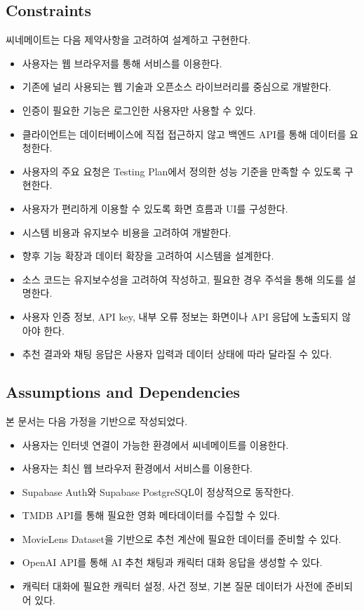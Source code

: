\documentclass[11pt,a4paper]{article}
\providecommand{\tightlist}{%
  \setlength{\itemsep}{0.25em}\setlength{\parskip}{0.1em}}
\begin{document}
\hypertarget{constraints}{%
\subsection{Constraints}\label{constraints}}

씨네메이트는 다음 제약사항을 고려하여 설계하고 구현한다.

\begin{itemize}
\tightlist
\item
  사용자는 웹 브라우저를 통해 서비스를 이용한다.
\item
  기존에 널리 사용되는 웹 기술과 오픈소스 라이브러리를 중심으로 개발한다.
\item
  인증이 필요한 기능은 로그인한 사용자만 사용할 수 있다.
\item
  클라이언트는 데이터베이스에 직접 접근하지 않고 백엔드 API를 통해 데이터를 요청한다.
\item
  사용자의 주요 요청은 Testing Plan에서 정의한 성능 기준을 만족할 수 있도록 구현한다.
\item
  사용자가 편리하게 이용할 수 있도록 화면 흐름과 UI를 구성한다.
\item
  시스템 비용과 유지보수 비용을 고려하여 개발한다.
\item
  향후 기능 확장과 데이터 확장을 고려하여 시스템을 설계한다.
\item
  소스 코드는 유지보수성을 고려하여 작성하고, 필요한 경우 주석을 통해 의도를 설명한다.
\item
  사용자 인증 정보, API key, 내부 오류 정보는 화면이나 API 응답에 노출되지 않아야 한다.
\item
  추천 결과와 채팅 응답은 사용자 입력과 데이터 상태에 따라 달라질 수 있다.
\end{itemize}

\hypertarget{assumptions-and-dependencies}{%
\subsection{Assumptions and Dependencies}\label{assumptions-and-dependencies}}

본 문서는 다음 가정을 기반으로 작성되었다.

\begin{itemize}
\tightlist
\item
  사용자는 인터넷 연결이 가능한 환경에서 씨네메이트를 이용한다.
\item
  사용자는 최신 웹 브라우저 환경에서 서비스를 이용한다.
\item
  Supabase Auth와 Supabase PostgreSQL이 정상적으로 동작한다.
\item
  TMDB API를 통해 필요한 영화 메타데이터를 수집할 수 있다.
\item
  MovieLens Dataset을 기반으로 추천 계산에 필요한 데이터를 준비할 수 있다.
\item
  OpenAI API를 통해 AI 추천 채팅과 캐릭터 대화 응답을 생성할 수 있다.
\item
  캐릭터 대화에 필요한 캐릭터 설정, 사건 정보, 기본 질문 데이터가 사전에 준비되어 있다.
\end{itemize}
\end{document}
